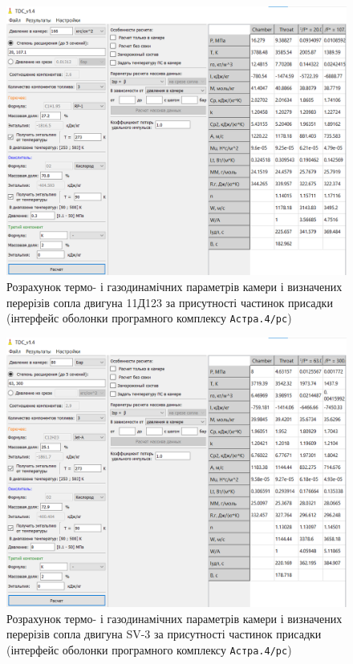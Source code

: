 \begin{figure}
	\centering
	\includegraphics[width=0.5\textheight, angle=0,origin=c]{chapter_3/11D123_add.png}
	\caption{Розрахунок термо- і газодинамічних параметрів камери і визначених перерізів сопла двигуна 11Д123 за присутності частинок присадки (інтерфейс оболонки програмного комплексу \texttt{Астра.4/рс})}
	\label{fig:11D123_add}
\end{figure}

\begin{figure}
	\centering
	\includegraphics[width=0.5\textheight, angle=0,origin=c]{chapter_3/SV-3_add.png}
	\caption{Розрахунок термо- і газодинамічних параметрів камери і визначених перерізів сопла двигуна SV-3 за присутності частинок присадки (інтерфейс оболонки програмного комплексу \texttt{Астра.4/рс})}
	\label{fig:SV-3_add}
\end{figure}

